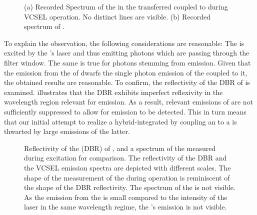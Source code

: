 \begin{figure}[!htb]
\begin{subfigure}[t]{ 0.49\linewidth}
					\caption{}
					\label{subfig::spectrum_vcsel_excitation_without_diamond}
				\end{subfigure}
				\caption[Comparison of spectra between \BmFour and \BmTwo]{(a) Recorded Spectrum of the \siv in the transferred \nd coupled to \BmFour during VCSEL operation. No distinct \siv lines are visible. (b) Recorded spectrum of \BmTwo.}
				\label{fig::vcsel_spectra}
			\end{figure}

		To explain the observation, the following considerations are reasonable: The \siv is excited by the \VCSEL{}'s laser and thus emitting photons which are passing through the filter window. The same is true for photons stemming from \VCSEL \sb emission. Given that the emission from the \sb of \BmFour dwarfs the single photon emission of the \siv coupled to it, the obtained results are reasonable.
		To confirm, the reflectivity of the DBR of \BmFour is examined.  illustrates that the DBR exhibits imperfect reflexivity in the wavelength region relevant for \siv emission. As a result, relevant \sb emissions of \BmFour are not sufficiently suppressed to allow for \siv emission to be detected. This in turn means that our initial attempt to realize a hybrid-integrated \sps by coupling an \siv to a \VCSELs is thwarted by large \sb emissions of the latter.

		\begin{figure}[!htb]
			\centering
			\caption[Reflectivity of \BmFour]{Reflectivity of the \dbr (DBR) of \BmFour \cite{Weidenfeld2012}, and a spectrum of the \siv measured during \VCSEL excitation for comparison. The reflectivity of the DBR and the VCSEL emission spectra are depicted with different scales. The shape of the measurement of the \siv during \VCSEL operation is reminiscent of the shape of the DBR reflectivity. The spectrum of the \siv is not visible. As the emission from the \siv is small compared to the intensity of the laser \sb in the same wavelength regime, the \siv{}'s emission is not visible.}
			\label{fig::dbr_vcsel}
		\end{figure}

